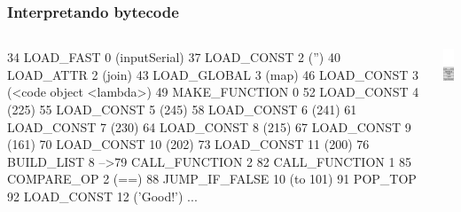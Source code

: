 \documentclass[9pt, notes=hide]{beamer}
\begin{document}
\begin{frame}[fragile]
    \frametitle{Interpretando bytecode}
        \begin{columns}[T]
            \begin{column}{.8\textwidth}
\begin{python}
   34  LOAD_FAST          0 (inputSerial)
   37  LOAD_CONST         2 ('')
   40  LOAD_ATTR          2 (join)
   43  LOAD_GLOBAL        3 (map)
   46  LOAD_CONST         3 (<code object <lambda>)
   49  MAKE_FUNCTION      0
   52  LOAD_CONST         4 (225)
   55  LOAD_CONST         5 (245)
   58  LOAD_CONST         6 (241)
   61  LOAD_CONST         7 (230)
   64  LOAD_CONST         8 (215)
   67  LOAD_CONST         9 (161)
   70  LOAD_CONST        10 (202)
   73  LOAD_CONST        11 (200)
   76  BUILD_LIST         8
-->79  CALL_FUNCTION      2
   82  CALL_FUNCTION      1
   85  COMPARE_OP         2 (==)
   88  JUMP_IF_FALSE     10 (to 101)
   91  POP_TOP
   92  LOAD_CONST        12 ('Good!')
   ...
\end{python}

            \end{column}
            \begin{column}{.3\textwidth}
                \includegraphics[width=2.5cm]{images/stack-2.png}
            \end{column}
        \end{columns}

\end{frame}
\end{document}
